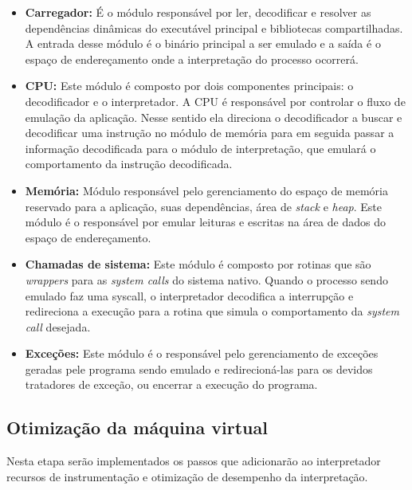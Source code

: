 \documentclass[11pt,twoside]{article}
\begin{document}
\begin{itemize}
    \item \textbf{Carregador:} É o módulo responsável por ler, decodificar e resolver as
    dependências dinâmicas do executável principal e bibliotecas compartilhadas. A entrada 
    desse módulo é o binário principal a ser emulado e a saída é o espaço de endereçamento 
    onde a interpretação do processo ocorrerá.

    \item \textbf{CPU:} Este módulo é composto por dois componentes principais: o decodificador
    e o interpretador. A CPU é responsável por controlar o fluxo de emulação da aplicação.
    Nesse sentido ela direciona o decodificador a buscar e decodificar uma instrução no
    módulo de memória para em seguida passar a informação decodificada para o módulo de 
    interpretação, que emulará o comportamento da instrução decodificada.

    \item \textbf{Memória:} Módulo responsável pelo gerenciamento do espaço de memória reservado 
    para a aplicação, suas dependências, área de \textit{stack} e \textit{heap}. Este módulo é o responsável por
    emular leituras e escritas na área de dados do espaço de endereçamento.

    \item \textbf{Chamadas de sistema:} Este módulo é composto por rotinas que são \textit{wrappers}
    para as \emph{system calls} do sistema nativo. Quando o processo sendo emulado faz uma
    syscall, o interpretador decodifica a interrupção e redireciona a execução para a rotina
    que simula o comportamento da \textit{system call} desejada. 
    
    \item \textbf{Exceções:} Este módulo é o responsável pelo gerenciamento de exceções 
    geradas pele programa sendo emulado e redirecioná-las para os devidos tratadores de
    exceção, ou encerrar a execução do programa. 
\end{itemize}

\subsection{Otimização da máquina virtual}

Nesta etapa serão implementados os passos que adicionarão ao interpretador 
recursos de instrumentação e otimização de desempenho da interpretação.
\end{document}
